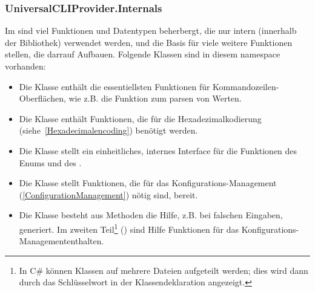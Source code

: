 \subsubsection{UniversalCLIProvider.Internals}
Im  sind viel Funktionen und Datentypen beherbergt, die nur intern (innerhalb der Bibliothek) verwendet werden,
und die Basis für viele weitere Funktionen stellen, die darrauf Aufbauen.
Folgende Klassen sind in diesem namespace vorhanden:
\begin{itemize}
 \item Die  Klasse enthält die essentiellsten Funktionen für Kommandozeilen-Oberflächen, wie z.B. die Funktion zum parsen von Werten.
 \item Die  Klasse enthält Funktionen, die für die Hexadezimalkodierung (siehe~\ref{Hexadecimalencoding}) benötigt werden.
 \item Die  Klasse stellt ein einheitliches, internes Interface für die Funktionen des  Enums und des .
 \item Die  Klasse stellt Funktionen, die für das Konfigurations-Management (\ref{ConfigurationManagement}) nötig sind, bereit.
 \item Die  Klasse besteht aus Methoden die Hilfe, z.B. bei falschen Eingaben, generiert.
 Im zweiten Teil\footnote{In C\# können Klassen auf mehrere Dateien aufgeteilt werden; dies wird dann durch das  Schlüsselwort in der Klassendeklaration angezeigt.}
 () sind Hilfe Funktionen für das Konfigurations-Managemententhalten.
\end{itemize}
